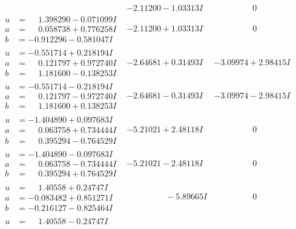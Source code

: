 \documentclass[1p]{elsarticle_modified}
\theoremstyle{definition}
\begin{document}
$$\begin{array}{c|c|c}
 & -2.11200 - 1.03313 I & \phantom{-0.000000 } 0 \\ \hline\begin{aligned}
u &= \phantom{-}1.398290 - 0.071099 I \\
a &= \phantom{-}0.058738 + 0.776258 I \\
b &= -0.912296 - 0.581047 I\end{aligned}
 & -2.11200 + 1.03313 I & \phantom{-0.000000 } 0 \\ \hline\begin{aligned}
u &= -0.551714 + 0.218194 I \\
a &= \phantom{-}0.121797 + 0.972740 I \\
b &= \phantom{-}1.181600 - 0.138253 I\end{aligned}
 & -2.64681 + 0.31493 I & -3.09974 + 2.98415 I \\ \hline\begin{aligned}
u &= -0.551714 - 0.218194 I \\
a &= \phantom{-}0.121797 - 0.972740 I \\
b &= \phantom{-}1.181600 + 0.138253 I\end{aligned}
 & -2.64681 - 0.31493 I & -3.09974 - 2.98415 I \\ \hline\begin{aligned}
u &= -1.404890 + 0.097683 I \\
a &= \phantom{-}0.063758 + 0.734444 I \\
b &= \phantom{-}0.395294 - 0.764529 I\end{aligned}
 & -5.21021 + 2.48118 I & \phantom{-0.000000 } 0 \\ \hline\begin{aligned}
u &= -1.404890 - 0.097683 I \\
a &= \phantom{-}0.063758 - 0.734444 I \\
b &= \phantom{-}0.395294 + 0.764529 I\end{aligned}
 & -5.21021 - 2.48118 I & \phantom{-0.000000 } 0 \\ \hline\begin{aligned}
u &= \phantom{-}1.40558 + 0.24747 I \\
a &= -0.083482 + 0.851271 I \\
b &= -0.216127 - 0.825464 I\end{aligned}
 & \phantom{-0.000000 } -5.89665 I & \phantom{-0.000000 } 0 \\ \hline\begin{aligned}
u &= \phantom{-}1.40558 - 0.24747 I \\

\end{aligned}
\end{array}$$
\end{document}
